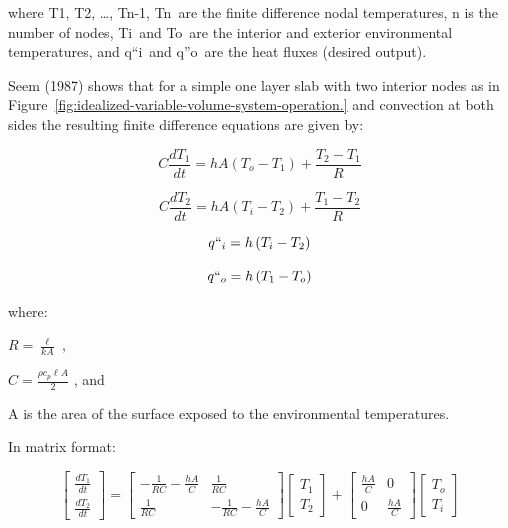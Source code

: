 where T1, T2, \ldots{}, Tn-1, Tn~are the finite difference nodal temperatures, n is the number of nodes, Ti~and To~are the interior and exterior environmental temperatures, and q``i~and q''o~are the heat fluxes (desired output).

Seem (1987) shows that for a simple one layer slab with two interior nodes as in Figure~\ref{fig:idealized-variable-volume-system-operation.} and convection at both sides the resulting finite difference equations are given by:

\begin{equation}
C\frac{{d{T_1}}}{{dt}} = hA\left( {{T_o} - {T_1}} \right) + \frac{{{T_2} - {T_1}}}{R}
\end{equation}

\begin{equation}
C\frac{{d{T_2}}}{{dt}} = hA\left( {{T_i} - {T_2}} \right) + \frac{{{T_1} - {T_2}}}{R}
\end{equation}

\begin{equation}
q{``_i} = h\left( {{T_i} - {T_2}} \right)
\end{equation}

\begin{equation}
q{``_o} = h\left( {{T_1} - {T_o}} \right)
\end{equation}

where:

\(R = \frac{\ell }{{kA}}\) ,

\(C = \frac{{\rho {c_p}\ell A}}{2}\) , and

A is the area of the surface exposed to the environmental temperatures.

In matrix format:

\begin{equation}
\left[\begin{array}{c}\frac{dT_1}{dt} \\ \frac{dT_2}{dt}\end{array}\right] = 
     \left[\begin{array}{cc}-\frac{1}{RC}-\frac{hA}{C} & \frac{1}{RC} \\ \frac{1}{RC} & -\frac{1}{RC}-\frac{hA}{C}\end{array}\right]\left[\begin{array}{c}T_1 \\ T_2\end{array}\right] + 
     \left[\begin{array}{cc}\frac{hA}{C} & 0 \\ 0 & \frac{hA}{C}\end{array}\right]\left[\begin{array}{c}T_o \\ T_i\end{array}\right]
\end{equation}

